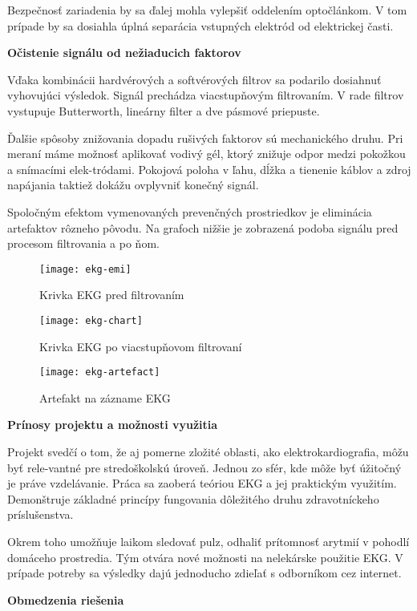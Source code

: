 \documentclass[titlepage,12pt]{article}
\begin{document}
Bezpečnosť zariadenia by sa ďalej mohla vylepšiť oddelením optočlánkom. V tom prípade by sa dosiahla úplná separácia vstupných elektród od elektrickej časti.
\newpage

\textbf{Očistenie signálu od nežiaducich faktorov}

Vďaka kombinácii hardvérových a softvérových filtrov sa podarilo dosiahnuť vyhovujúci výsledok. Signál prechádza viacstupňovým filtrovaním. V rade filtrov  vystupuje Butterworth, lineárny filter a dve pásmové priepuste. 

Ďalšie spôsoby znižovania dopadu rušivých faktorov sú mechanického druhu. Pri meraní máme možnosť aplikovať vodivý gél, ktorý znižuje odpor medzi pokožkou a snímacími elek-tródami. Pokojová poloha v ľahu, dĺžka a tienenie káblov a zdroj napájania taktiež dokážu ovplyvniť konečný signál.

Spoločným efektom vymenovaných prevenčných prostriedkov je eliminácia artefaktov \linebreak rôzneho pôvodu. Na grafoch nižšie je zobrazená podoba signálu pred procesom filtrovania \linebreak a po ňom.

\begin{figure}[!ht]
\begin{center}
\texttt{[image: ekg-emi]}
\caption{Krivka EKG pred filtrovaním}
\texttt{[image: ekg-chart]}
\caption{Krivka EKG po viacstupňovom filtrovaní}
\texttt{[image: ekg-artefact]}
\caption{Artefakt na zázname EKG}
\end{center}
\end{figure}

\newpage

\textbf{Prínosy projektu a možnosti využitia}

Projekt svedčí o tom, že aj pomerne zložité oblasti, ako elektrokardiografia, môžu byť rele-vantné pre stredoškolskú úroveň. Jednou zo sfér, kde môže byť úžitočný je práve vzdelávanie. Práca sa zaoberá teóriou EKG a jej praktickým využitím. Demonštruje základné princípy fungovania dôležitého druhu zdravotníckeho príslušenstva.

Okrem toho umožňuje laikom sledovať pulz, odhaliť prítomnosť arytmií v pohodlí domáceho prostredia. Tým otvára nové možnosti na nelekárske použitie EKG. V prípade potreby sa výsledky dajú jednoducho zdieľať s odborníkom cez internet.
\\
\bigskip

\textbf{Obmedzenia riešenia}
\end{document}
